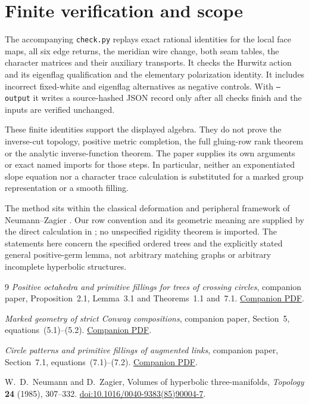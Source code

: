 \section{Finite verification and scope}\label{ng:scope}

The accompanying \texttt{check.py} replays exact rational identities
for the local face maps, all six edge returns, the meridian wire
change, both seam tables, the character matrices and their
auxiliary transports. It checks the Hurwitz action and its
eigenflag qualification and the elementary polarization identity.
It includes incorrect fixed-white and eigenflag alternatives as
negative controls. With \texttt{--output} it writes a source-hashed
JSON record only after all checks finish and the inputs are
verified unchanged.

These finite identities support the displayed algebra. They do
not prove the inverse-cut topology, positive metric completion,
the full gluing-row rank theorem or the analytic inverse-function
theorem. The paper supplies its own arguments or exact named
imports for those steps. In particular, neither an exponentiated
slope equation nor a character trace calculation is substituted
for a marked group representation or a smooth filling.

The method sits within the classical deformation and peripheral
framework of Neumann--Zagier \cite{NZ}. Our row convention
and its geometric meaning are supplied by the direct calculation
in \cite{Marked}; no unspecified rigidity theorem is imported.
The statements here concern the specified ordered trees and the
explicitly stated general positive-germ lemma, not arbitrary
matching graphs or arbitrary incomplete hyperbolic structures.

\begin{thebibliography}{9}
\emph{Positive octahedra and primitive fillings for trees of crossing circles},
companion paper, Proposition~2.1, Lemma~3.1 and
Theorems~1.1 and~7.1.
\href{https://sashakolpakov.github.io/murakamis_dream/papers/circle-tree-geometry.pdf}
{Companion PDF}.

\emph{Marked geometry of strict Conway compositions},
companion paper, Section~5, equations~(5.1)--(5.2).
\href{https://sashakolpakov.github.io/murakamis_dream/papers/strict-conway-geometry.pdf}
{Companion PDF}.

\emph{Circle patterns and primitive fillings of augmented links},
companion paper, Section~7.1, equations~(7.1)--(7.2).
\href{https://sashakolpakov.github.io/murakamis_dream/papers/marked-fillings.pdf}
{Companion PDF}.

W.~D.~Neumann and D.~Zagier,
Volumes of hyperbolic three-manifolds,
\emph{Topology} \textbf{24} (1985), 307--332.
\href{https://doi.org/10.1016/0040-9383(85)90004-7}
{doi:10.1016/0040-9383(85)90004-7}.
\end{thebibliography}
